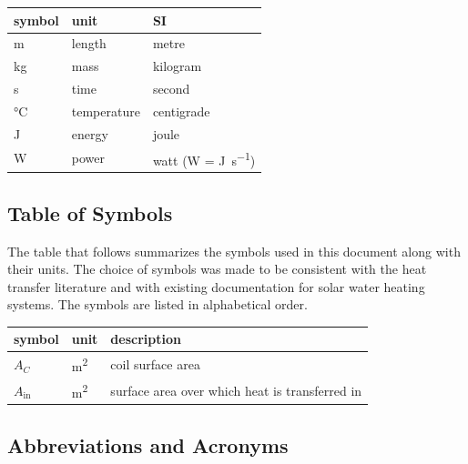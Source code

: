\documentclass[12pt]{article}
\begin{document}
\renewcommand{\arraystretch}{1.2}
\noindent \begin{tabular}{l l l}
  \toprule
  \textbf{symbol} & \textbf{unit} & \textbf{SI}                       \\
  \midrule
  \si{\metre}     & length        & metre                             \\
  \si{\kilogram}  & mass          & kilogram                          \\
  \si{\second}    & time          & second                            \\
  \si{\celsius}   & temperature   & centigrade                        \\
  \si{\joule}     & energy        & joule                             \\
  \si{\watt}      & power         & watt (W = \si{\joule\per\second}) \\
  \bottomrule
\end{tabular}


\subsection{Table of Symbols}

The table that follows summarizes the symbols used in this document along with
their units.  The choice of symbols was made to be consistent with the heat
transfer literature and with existing documentation for solar water heating
systems.  The symbols are listed in alphabetical order.

\renewcommand{\arraystretch}{1.2}
\noindent \begin{longtable*}{l l p{12cm}} \toprule
  \textbf{symbol} & \textbf{unit} & \textbf{description}\\
  \midrule
  $A_C$ & \si[per-mode=symbol] {\square\metre} & coil surface area
  \\
  $A_\text{in}$ & \si[per-mode=symbol] {\square\metre} & surface area over
  which heat is transferred in
  \\
  \bottomrule
\end{longtable*}

\subsection{Abbreviations and Acronyms}
\end{document}
